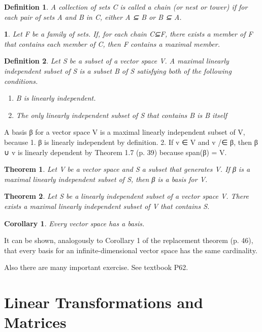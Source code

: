\documentclass{article}
\theoremstyle{plain}
\newtheorem{theorem}{Theorem}[section]
\newtheorem*{corollary}{Corollary}
\newtheorem*{definition1}{Definition}
\theoremstyle{plain} %
\newcommand{\thistheoremname}{}
\newtheorem*{genericthm}{\thistheoremname}
\newenvironment{namedtheorem}[1]
  {\renewcommand{\thistheoremname}{#1}%
   \begin{genericthm}}
  {\end{genericthm}}
\begin{document}
\begin{definition1}
A collection of sets C is called a chain (or nest or tower) if for each pair of sets A and B in C, either A ⊆ B or B ⊆ A.
\end{definition1}

\begin{namedtheorem}{Maximal Principle}
 Let F be a family of sets. If, for each chain C⊆F, there exists a member of F that contains each member of C, then F contains a maximal member.
\end{namedtheorem}

\begin{definition1}
Let S be a subset of a vector space V. A maximal linearly
independent subset of S is a subset B of S satisfying both of the following
conditions.
\begin{enumerate}[label=(\alph*)]
\item B is linearly independent.
\item The only linearly independent subset of S that contains B is B itself
\end{enumerate}
\end{definition1}

A basis β for a vector space V is a maximal linearly independent subset
of V, because
1. β is linearly independent by definition.
2. If v ∈ V and v /∈ β, then β ∪ {v} is linearly dependent by Theorem 1.7
(p. 39) because span(β) = V.

\begin{theorem}
Let V be a vector space and S a subset that generates V. If β is a maximal linearly independent subset of S, then β is a basis for V.
\end{theorem}

\begin{theorem}
Let S be a linearly independent subset of a vector space
V. There exists a maximal linearly independent subset of V that contains S.
\end{theorem}

\begin{corollary}
Every vector space has a basis.
\end{corollary}

It can be shown, analogously to Corollary 1 of the replacement theorem (p. 46), that every basis for an infinite-dimensional vector space has the same cardinality.

Also there are many important exercise. See textbook P62.

\section{Linear Transformations and Matrices}
\end{document}
